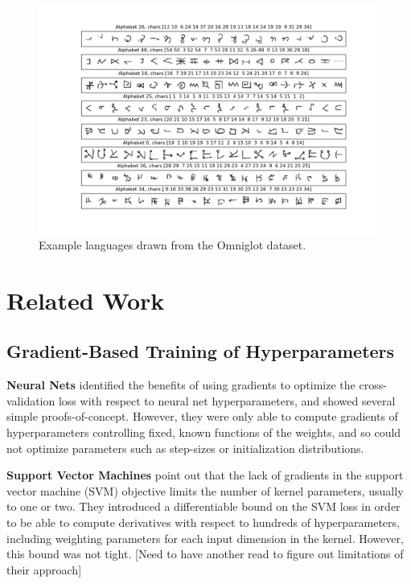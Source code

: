 \documentclass{article}
\begin{document}
\begin{figure}[h!]
\vskip 0.2in
\begin{center}
\centerline{\includegraphics[width=\columnwidth]{../experiments/Jan_27_first_omniglot_expt/random_images.png}}
\caption{Example languages drawn from the Omniglot dataset.}
\label{fig:omniglot}
\end{center}
\vskip -0.2in
\end{figure} 




\section{Related Work}

\subsection{Gradient-Based Training of Hyperparameters}
\textbf{Neural Nets}
\citet{bengio2000gradient, larsen1998adaptive} identified the benefits of using gradients to optimize the cross-validation loss with respect to neural net hyperparameters, and showed several simple proofs-of-concept.
However, they were only able to compute gradients of hyperparameters controlling fixed, known functions of the weights, and so could not optimize parameters such as step-sizes or initialization distributions.

\textbf{Support Vector Machines}
\citet{chapelle2002choosing} point out that the lack of gradients in the support vector machine (SVM) objective limits the number of kernel parameters, usually to one or two.
They introduced a differentiable bound on the SVM loss in order to be able to compute derivatives with respect to hundreds of hyperparameters, including weighting parameters for each input dimension in the kernel.
However, this bound was not tight. [Need to have another read to figure out limitations of their approach]
\end{document}
